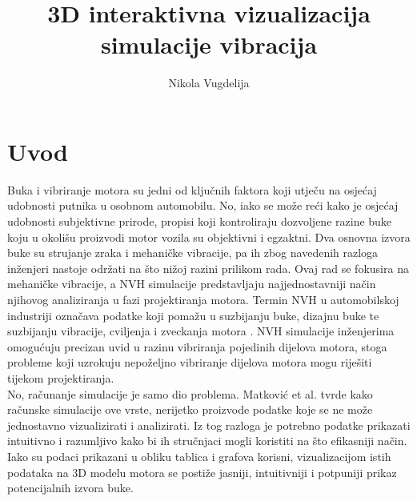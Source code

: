 \documentclass[times, utf8, diplomski]{fer}
\begin{document}

\title{3D interaktivna vizualizacija simulacije vibracija}

\author{Nikola Vugdelija}

\maketitle



\tableofcontents

\chapter{Uvod}
Buka i vibriranje motora su jedni od ključnih faktora koji utječu na osjećaj udobnosti putnika u osobnom automobilu. No, iako se može reći kako je osjećaj udobnosti subjektivne prirode, propisi koji kontroliraju dozvoljene razine buke koju u okolišu proizvodi motor vozila su objektivni i egzaktni. Dva osnovna izvora buke su strujanje zraka i mehaničke vibracije, pa ih zbog navedenih razloga inženjeri nastoje održati na što nižoj razini prilikom rada. Ovaj rad se fokusira na mehaničke vibracije, a NVH  simulacije predstavljaju najjednostavniji način njihovog analiziranja u fazi projektiranja motora. Termin NVH u automobilskoj industriji označava podatke koji pomažu u suzbijanju buke, dizajnu buke te suzbijanju vibracije, cviljenja i zveckanja motora \citep{harrison2004vehicle}. NVH simulacije inženjerima omogućuju precizan uvid u razinu vibriranja pojedinih dijelova motora, stoga probleme koji uzrokuju nepoželjno vibriranje dijelova motora mogu riješiti tijekom projektiranja.\\

No, računanje simulacije je samo dio problema. Matković et al. \citep{matkovic2021getting} tvrde kako računske simulacije ove vrste, nerijetko proizvode podatke koje se ne može jednostavno vizualizirati i analizirati. Iz tog razloga je potrebno podatke prikazati intuitivno i razumljivo kako bi ih stručnjaci mogli koristiti na što efikasniji način. Iako su podaci prikazani u obliku tablica i grafova korisni, vizualizacijom istih podataka na 3D modelu motora se postiže jasniji, intuitivniji i potpuniji prikaz potencijalnih izvora buke.\\
\end{document}
